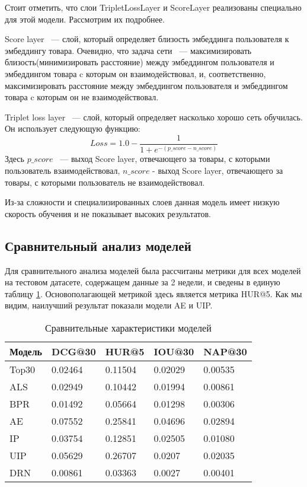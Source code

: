 \documentclass[14pt]{mmcs_article}
\begin{document}
Стоит отметить, что слои TripletLossLayer и ScoreLayer реализованы специально для этой модели. Рассмотрим их подробнее.

Score layer  ~--- слой, который определяет близость эмбеддинга пользователя к эмбеддингу товара. Очевидно, что задача сети ~---  максимизировать близость(минимизировать расстояние) между эмбеддингом пользователя и эмбеддингом товара c которым он взаимодействовал, и, соответственно, максимизировать расстояние между эмбеддингом пользователя и эмбеддингом товара c которым он не взаимодействовал.

Triplet loss layer ~--- слой, который определяет насколько хорошо сеть обучилась. Он использует следующую функцию:
\begin{equation}
	Loss = 1.0 - \frac{1}{1 + e^{-(p\_score-n\_score)}}
\end{equation}
Здесь $p\_score$ ~--- выход Score layer, отвечающего за товары, с которыми пользователь взаимодействовал, $n\_score$ - выход Score layer, отвечающего за товары, с которыми пользователь не  взаимодействовал. 

Из-за сложности и специализированных слоев данная модель имеет низкую скорость обучения и не показывает высоких результатов.

\subsection{Сравнительный анализ моделей}
Для сравнительного анализа моделей была рассчитаны метрики для всех моделей на тестовом датасете, содержащем данные за 2 недели, и сведены в единую таблицу \ref{semifin:table:1}.
Основополагающей метрикой здесь является метрика HUR@5. Как мы видим, наилучший результат показали модели AE и UIP.
\begin{table}[H]
	\centering
	\caption{Сравнительные характеристики моделей}\label{semifin:table:1}
\begin{tabular}{| l |l| l| l| l|}
	\hline
	Модель & DCG@30 & HUR@5 & IOU@30 &  NAP@30 \\
	\hline
	Top30 & 0.02464 & 0.11504 & 0.02029 & 0.00535 \\
	\hline
	ALS & 0.02949 & 0.10442 & 0.01994 &  0.00861 \\
	\hline
	BPR & 0.01492 & 0.05664 & 0.01298 & 0.00306\\
	\hline
	AE & 0.07552 & 0.25841 & 0.04696 &  0.02894 \\
	\hline
	IP & 0.03754 & 0.12851 & 0.02505 & 0.01080 \\
	\hline
	UIP & 0.05629 & 0.26707 & 0.0207 &  0.02035 \\
	\hline
	DRN & 0.00861 & 0.03363 & 0.0027 & 0.00401 \\
	\hline
\end{tabular}
\end{table}
\end{document}

